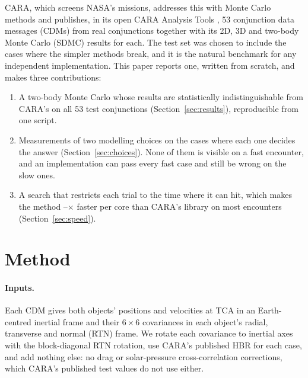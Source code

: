 \documentclass[11pt]{article}
\newcommand{\x}{$\times$}
\begin{document}
CARA, which screens NASA's missions, addresses this with Monte Carlo methods
\cite{hall2018,nasa2020handbook} and publishes, in its open CARA Analysis Tools
\cite{caratools}, 53 conjunction data messages (CDMs) from real conjunctions together with its
2D, 3D and two-body Monte Carlo (SDMC) results for each. The test set was chosen to include the
cases where the simpler methods break, and it is the natural benchmark for any independent
implementation. This paper reports one, written from scratch, and makes three contributions:

\begin{enumerate}\itemsep0pt
\item A two-body Monte Carlo whose results are statistically indistinguishable from CARA's on
all 53 test conjunctions (Section~\ref{sec:results}), reproducible from one script.
\item Measurements of two modelling choices on the cases where each one decides the answer
(Section~\ref{sec:choices}). None of them is visible on a fast encounter, and an
implementation can pass every fast case and still be wrong on the slow ones.
\item A search that restricts each trial to the time where it can hit, which makes the
method \nLibSpeedMin--\nLibSpeedMax\x{} faster per core than CARA's library on most encounters
(Section~\ref{sec:speed}).
\end{enumerate}

\section{Method}\label{sec:method}

\paragraph{Inputs.} Each CDM gives both objects' positions and velocities at TCA in an
Earth-centred inertial frame and their $6\times6$ covariances in each object's radial,
transverse and normal (RTN) frame. We rotate each covariance to inertial axes with the
block-diagonal RTN rotation, use CARA's published HBR for each case, and add nothing else: no
drag or solar-pressure cross-correlation corrections, which CARA's published test values do not
use either.
\end{document}
